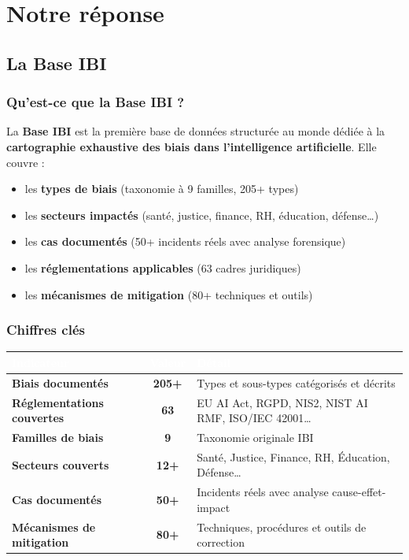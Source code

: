 \documentclass[11pt,a4paper,openany]{book}
\begin{document}
\clearpage

\part{Notre réponse}
\label{part:base}

\chapter{La Base IBI}

\section{Qu'est-ce que la Base IBI ?}

La \textbf{Base IBI} est la première base de données structurée au monde dédiée à la \textbf{cartographie exhaustive des biais dans l'intelligence artificielle}. Elle couvre :
\begin{itemize}[leftmargin=1.5em]
  \item les \textbf{types de biais} (taxonomie à 9 familles, 205+ types)
  \item les \textbf{secteurs impactés} (santé, justice, finance, RH, éducation, défense…)
  \item les \textbf{cas documentés} (50+ incidents réels avec analyse forensique)
  \item les \textbf{réglementations applicables} (63 cadres juridiques)
  \item les \textbf{mécanismes de mitigation} (80+ techniques et outils)
\end{itemize}

\section{Chiffres clés}

\begin{center}
\renewcommand{\arraystretch}{1.4}
\begin{tabularx}{\textwidth}{@{}>{\bfseries}p{5cm}>{\Large}cX@{}}
\toprule
\rowcolor{navy}
\textcolor{white}{Indicateur} & \textcolor{white}{Valeur} & \textcolor{white}{Détail} \\
\midrule
Biais documentés & \textbf{205+} & Types et sous-types catégorisés et décrits \\
\rowcolor{light}
Réglementations couvertes & \textbf{63} & EU AI Act, RGPD, NIS2, NIST AI RMF, ISO/IEC 42001… \\
Familles de biais & \textbf{9} & Taxonomie originale IBI \\
\rowcolor{light}
Secteurs couverts & \textbf{12+} & Santé, Justice, Finance, RH, Éducation, Défense… \\
Cas documentés & \textbf{50+} & Incidents réels avec analyse cause-effet-impact \\
\rowcolor{light}
Mécanismes de mitigation & \textbf{80+} & Techniques, procédures et outils de correction \\
\bottomrule
\end{tabularx}
\end{center}
\end{document}
